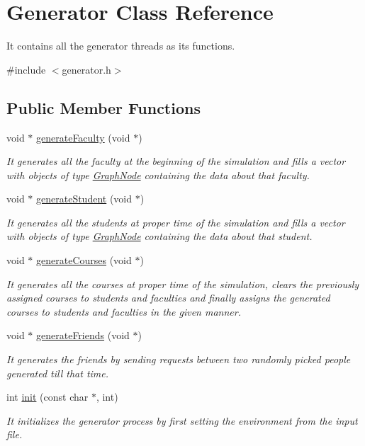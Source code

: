\hypertarget{classGenerator}{\section{\-Generator \-Class \-Reference}
\label{classGenerator}
}


\-It contains all the generator threads as its functions.  




{\ttfamily \#include $<$generator.\-h$>$}

\subsection*{\-Public \-Member \-Functions}
\begin{DoxyCompactItemize}
\item 
void $\ast$ \hyperlink{classGenerator_a2b3944991462645d4867df8f6aeacdf2}{generate\-Faculty} (void $\ast$)
\begin{DoxyCompactList}\small\item\em \-It generates all the faculty at the beginning of the simulation and fills a vector with objects of type \hyperlink{structGraphNode}{\-Graph\-Node} containing the data about that faculty. \end{DoxyCompactList}\item 
void $\ast$ \hyperlink{classGenerator_a5d06c31c1536ef87d72ef07b8ebc4d8e}{generate\-Student} (void $\ast$)
\begin{DoxyCompactList}\small\item\em \-It generates all the students at proper time of the simulation and fills a vector with objects of type \hyperlink{structGraphNode}{\-Graph\-Node} containing the data about that student. \end{DoxyCompactList}\item 
void $\ast$ \hyperlink{classGenerator_ac3611f0e4174e593f355e19afde9516b}{generate\-Courses} (void $\ast$)
\begin{DoxyCompactList}\small\item\em \-It generates all the courses at proper time of the simulation, clears the previously assigned courses to students and faculties and finally assigns the generated courses to students and faculties in the given manner. \end{DoxyCompactList}\item 
void $\ast$ \hyperlink{classGenerator_a09cf7c8e4504149a469f5caba0b97ac6}{generate\-Friends} (void $\ast$)
\begin{DoxyCompactList}\small\item\em \-It generates the friends by sending requests between two randomly picked people generated till that time. \end{DoxyCompactList}\item 
int \hyperlink{classGenerator_afbcd4685bdc0226c98d5dd708894ea22}{init} (const char $\ast$, int)
\begin{DoxyCompactList}\small\item\em \-It initializes the generator process by first setting the environment from the input file. \end{DoxyCompactList}\end{DoxyCompactItemize}


